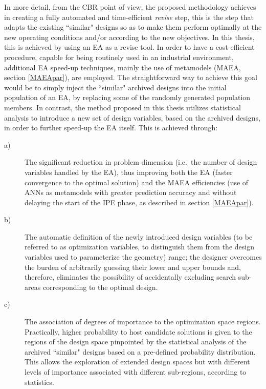In more detail, from the CBR point of view, the proposed methodology achieves in creating a fully automated and time-efficient \textit{revise} step, this is the step that adapts the existing ``similar" designs so as to make them perform optimally at the new operating conditions and/or according to the new objectives. In this thesis, this is achieved by using an EA as a revise tool. In order to have a cost-efficient procedure, capable for being routinely used in an industrial environment, additional EA speed-up techniques, mainly the use of metamodels (MAEA, section \ref{MAEApar}), are employed. The straightforward way to achieve this goal would be to simply inject the ``similar" archived designs into the initial population of an EA, by replacing some of the randomly generated population members.
In contrast, the method proposed in this thesis utilizes statistical analysis to introduce a new set of design variables, based on the archived designs, in order to further speed-up the EA itself. This is achieved through:  
\begin{description}
  \item[a)]The significant reduction in problem dimension (i.e.\ the number of design variables handled by the EA), thus improving both the EA (faster convergence to the optimal solution) and the MAEA efficiencies (use of ANNs as metamodels  with greater prediction accuracy and without delaying the start of the IPE phase, as described in section \ref{MAEApar}). 
  \item[b)]The automatic definition of the newly introduced design variables (to be referred to as optimization variables, to distinguish them from the design variables used to parameterize the geometry) range; the designer overcomes the burden of arbitrarily guessing their lower and upper bounds and, therefore, eliminates the possibility of accidentally excluding search sub-areas corresponding to the optimal design. 
    \item[c)]The association of degrees of importance to the optimization space regions. Practically, higher probability to host candidate solutions is given to the regions of the design space pinpointed by the statistical analysis of the archived ``similar" designs based on a pre-defined probability distribution. This allows the exploration of extended design spaces but with different levels of importance associated with different sub-regions, according to statistics.
\end{description}

